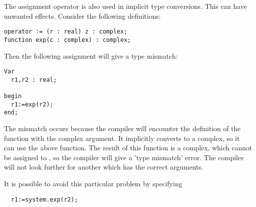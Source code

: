 \begin{remark}
The assignment operator is also used in implicit type conversions. This can
have unwanted effects. Consider the following definitions:
\begin{verbatim}
operator := (r : real) z : complex;
function exp(c : complex) : complex;
\end{verbatim}
Then the following assignment will give a type mismatch:
\begin{verbatim}
Var
  r1,r2 : real;

begin
  r1:=exp(r2);
end;
\end{verbatim}
The mismatch occurs because the compiler will encounter the definition of the  function
with the complex argument. It implicitly converts  to a complex, so it can
use the above  function. The result of this function is a complex,
which cannot be assigned to , so the compiler will give a 'type mismatch'
error. The compiler will not look further for another  which has
the correct arguments.

It is possible to avoid this particular problem by specifying
\begin{verbatim}
  r1:=system.exp(r2);
\end{verbatim}
\end{remark}

